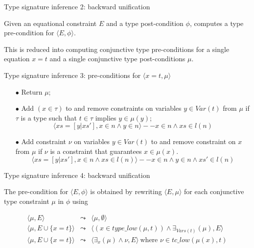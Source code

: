 \documentclass{beamer}
\def\land{\wedge}
\def\pspace{\vspace*{\fill}}
\begin{document}
\begin{frame}{Type signature inference 2: backward unification}

\pspace

Given an equational constraint $E$ and a type post-condition
$\phi$, computes a type pre-condition for $\langle E,\phi\rangle$.

\pspace

This is reduced into computing conjunctive type pre-conditions for
a single equation $x=t$ and a single conjunctive type
post-conditions $\mu$.

\pspace

\end{frame}

\begin{frame}{Type signature inference 3: pre-conditions for $\langle x=t,\mu\rangle$}

\pspace

\begin{itemize}
\item [$\bullet$] Return $\mu$; \item [$\bullet$] Add $(x\in
\tau)$ to and remove constraints on variables $y\in Var(t)$ from
$\mu$ if {$\tau$ is a type such that $t\in{\tau}$ implies
$y\in\mu(y)$};
\[\langle xs=[y|xs'], x\in{n}\land y\in{n}\rangle
    -- x\in{n}\land xs\in{l}({n})
\]
\item [$\bullet$] Add constraint $\nu$ on variables $y\in Var(t)$
to and remove constraint on $x$ from $\mu$ if {$\nu$ is a
constraint that guarantees $x\in\mu(x)$}.
\[
\langle xs=[y|xs'], x\in{n}\land xs\in{l}({n})\rangle --
 x\in{n}\land y\in{n}\land xs'\in{l}({n})
\]
\end{itemize}

\pspace

\end{frame}

\begin{frame}{Type signature inference 4: backward unification}

\pspace

The pre-condition for $\langle E,\phi\rangle$ is obtained by
rewriting $\langle E,\mu\rangle$ for each conjunctive type
constraint $\mu$ in $\phi$ using

\begin{eqnarray*}
\langle\mu,E\rangle &\leadsto& \langle\mu,\emptyset\rangle \\
\langle\mu,E\cup\{x=t\}\rangle &\leadsto&
    \langle(x\in{type\_low}(\mu,t))\land\exists_{Vars(t)}(\mu),E\rangle \label{rw:2}\\
\langle\mu,E\cup\{x=t\}\rangle &\leadsto&
    \langle\exists_{x}(\mu)\land\nu,E\rangle
    ~\mbox{where $\nu{\in}{tc\_low}(\mu(x),t)$}
\end{eqnarray*}

\pspace

\end{frame}
\end{document}
